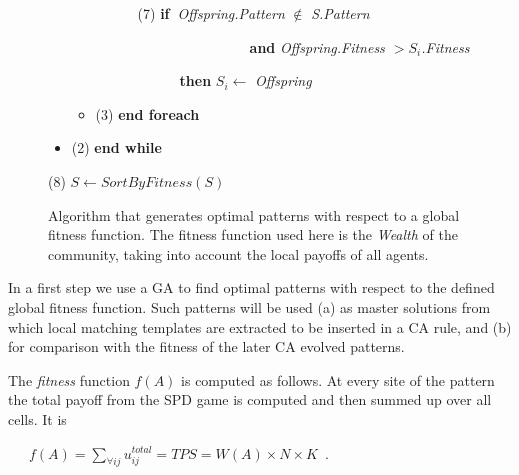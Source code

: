 \documentclass[10pt,a4paper]{article}  %
\begin{document}
\begin{figure}[H]
\begin{itemize}
\begin{itemize}
    ~~~~~~(7) \textbf{if~}\textit{Offspring.Pattern}  $\notin$ \textit{S.Pattern } %
    
    ~~~~~~~~~~~~~~~~~~~~~~\textbf{and}  \textit{Offspring.Fitness $> S_i$.Fitness}
    
    ~~~~~~~~~~~~\textbf{then} $S_i \leftarrow$ \textit{Offspring}
          
      
    \item [] (3) \textbf{end foreach}      
    \end{itemize}
   
\item []  (2) \textbf{end while}
\end{itemize}

(8) $S \leftarrow SortByFitness(S)$

\hrulefill
\endgroup

\caption{Algorithm that generates optimal patterns with respect to a global 
fitness function. 
The fitness function used here is the \textit{Wealth} of the community, taking into account 
the local payoffs of all agents. 
}

\label{Algorithm1}
\end{figure}


In a first step we use a GA to find optimal patterns with
respect to the defined global fitness function.
Such patterns will be used 
(a) as master solutions from which local matching templates are extracted
to be inserted in a CA rule,
and 
(b) for comparison with the fitness of the later CA evolved patterns. 

The \textit{fitness} function $f(A)$ is computed as follows. %
At every site of the pattern the total payoff from the SPD game is computed and then
summed up over all cells. It is

~~~$f(A) =  \sum_{\forall{ij}} {\textit{u}_{ij}^{total}} =\textit{TPS} = W(A) \times N \times K$~.
\end{document}
